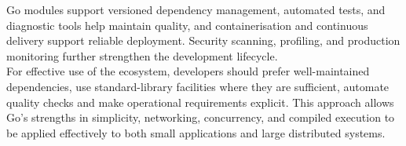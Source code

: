 Go modules support versioned dependency management, automated tests, and diagnostic tools help maintain quality, and containerisation and continuous delivery support reliable deployment. Security scanning, profiling, and production monitoring further strengthen the development lifecycle.\\

For effective use of the ecosystem, developers should prefer well-maintained dependencies, use standard-library facilities where they are sufficient, automate quality checks and make operational requirements explicit. This approach allows Go's strengths in simplicity, networking, concurrency, and compiled execution to be applied effectively to both small applications and large distributed systems.

